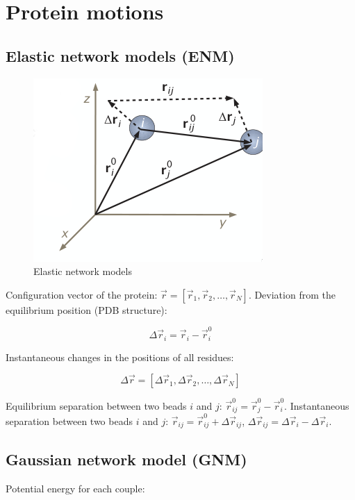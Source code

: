 \graphicspath{{chapters/15/images}}
\chapter{Protein motions}

\section{Elastic network models (ENM)}

\begin{figure}[H]
	\includegraphics[width=\textwidth]{enm-theory}
	\caption{Elastic network models}
	\label{fig:kirchhoff-adjacency}
\end{figure}

Configuration vector of the protein: $\vec{r} = [\vec{r}_1, \vec{r}_2, \dots, \vec{r}_N]$.
Deviation from the equilibrium position (PDB structure):

$$\Delta\vec{r}_i = \vec{r}_i-\vec{r}_i^0$$

Instantaneous changes in the positions of all residues:

$$\Delta\vec{r} = [\Delta\vec{r}_1, \Delta\vec{r}_2, \dots, \Delta\vec{r}_N]$$


Equilibrium separation between two beads $i$ and $j$: $\vec{r}_{ij}^0 = \vec{r}_j^0-\vec{r}_i^0$.
Instantaneous separation between two beads $i$ and $j$: $\vec{r}_{ij} = \vec{r}_{ij}^0+\Delta\vec{r}_{ij}$, $\Delta\vec{r}_{ij} = \Delta\vec{r}_i-\Delta\vec{r}_i$.

\section{Gaussian network model (GNM)}
Potential energy for each couple:

